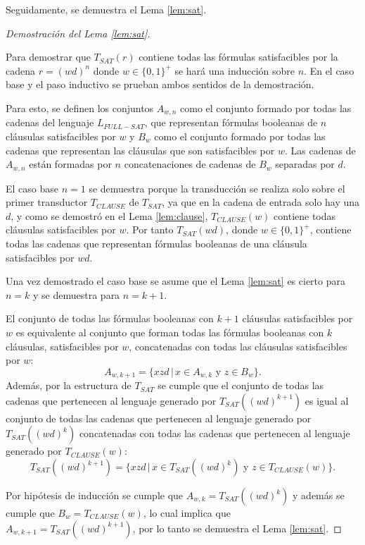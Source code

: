 Seguidamente, se demuestra el Lema \ref{lem:sat}.

\begin{proof}[Demostración del Lema \ref{lem:sat}] \
    
    Para demostrar que $T_{SAT}(r)$ contiene todas las fórmulas satisfacibles por la cadena $r=(wd)^n$ donde $w\in\{0,1\}^+$ se hará una inducción sobre $n$. En el caso base y el paso inductivo
    se prueban ambos sentidos de la demostración.  
    
    Para esto, se definen los conjuntos $A_{w,n}$ como el conjunto formado por todas las cadenas del lenguaje $L_{FULL-SAT}$, que representan fórmulas booleanas de $n$ cláusulas satisfacibles por $w$ y $B_w$ como el conjunto formado por todas las cadenas que representan las cláusulas que son satisfacibles por $w$. Las cadenas de $A_{w,n}$ están formadas por $n$ concatenaciones de cadenas de $B_w$ separadas por $d$.
    
    El caso base $n=1$ se demuestra porque la transducción se realiza solo sobre el primer transductor $T_{CLAUSE}$ de $T_{SAT}$, ya que en la cadena de entrada solo hay una $d$, y como se demostró en el Lema \ref{lem:clause}, $T_{CLAUSE}(w)$ contiene todas cláusulas satisfacibles por $w$. Por tanto $T_{SAT}(wd)$, donde $w\in \{0,1\}^+$, contiene todas las cadenas que representan fórmulas booleanas de una cláusula satisfacibles por $wd$.
    
    Una vez demostrado el caso base se asume que el Lema \ref{lem:sat} es cierto para $n=k$ y se demuestra para $n=k+1$.
    
    El conjunto de todas las fórmulas booleanas con $k+1$ cláusulas satisfacibles por $w$ es equivalente al conjunto que forman todas las fórmulas booleanas con $k$ cláusulas, satisfacibles por $w$, concatenadas con todas las cláusulas satisfacibles por $w$: $$A_{w,k+1}=\{xzd\,|\,x\in A_{w,k} \text{ y } z\in B_w\}.$$ Además, por la estructura de $T_{SAT}$ se cumple que el conjunto de todas las cadenas que pertenecen al lenguaje generado por $T_{SAT}((wd)^{k+1})$ es igual al conjunto de todas las cadenas que pertenecen al lenguaje generado por $T_{SAT}((wd)^{k})$ concatenadas con todas las cadenas que pertenecen al lenguaje generado por $T_{CLAUSE}(w)$:
    $$T_{SAT}((wd)^{k+1})=\{xzd\,|\,x\in T_{SAT}((wd)^{k}) \text{ y } z\in T_{CLAUSE}(w)\}.$$
    
    Por hipótesis de inducción se cumple que $A_{w,k}=T_{SAT}((wd)^{k})$ y además se cumple que $B_w=T_{CLAUSE}(w)$, lo cual implica que $A_{w,k+1}=T_{SAT}((wd)^{k+1})$, por lo tanto se demuestra el Lema \ref{lem:sat}.
\end{proof}

